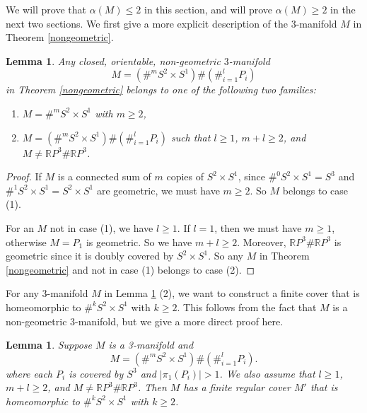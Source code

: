 \documentclass{amsart}
\newtheorem{lem}[thm]{Lemma}
\begin{document}
 We will prove that $\alpha(M)\leq 2$ in this section, and will prove $\alpha(M)\geq 2$ in the next two sections. We first give a more explicit description of the $3$-manifold $M$ in Theorem \ref{nongeometric}.
    
\begin{lem}\label{classify}
Any closed, orientable, non-geometric $3$-manifold $$M=(\#^mS^2\times S^1)\#(\#_{i=1}^l P_i)$$ in Theorem \ref{nongeometric} belongs to one of the following two families:
\begin{enumerate}
\item $M=\#^mS^2\times S^1$ with $m\geq 2$,
\item $M=(\#^mS^2\times S^1)\#(\#_{i=1}^l P_i)$ such that $l\geq 1$, $m+l\geq 2$, and $M\ne \mathbb{R}P^3\#\mathbb{R}P^3$.
\end{enumerate}
\end{lem}

\begin{proof}
If $M$ is a connected sum of $m$ copies of $S^2\times S^1$, since $\#^0S^2\times S^1=S^3$ and $\#^1S^2\times S^1=S^2\times S^1$ are geometric, we must have $m\geq 2$. So $M$ belongs to case (1).

For an $M$ not in case (1), we have $l\geq 1$. If $l=1$, then we must have $m\geq 1$, otherwise $M=P_1$ is geometric. So we have $m+l\geq 2$. Moreover, $\mathbb{R}P^3\# \mathbb{R}P^3$ is geometric since it is doubly covered by $S^2\times S^1$. So any $M$ in Theorem \ref{nongeometric} and not in case (1) belongs to case (2). 
\end{proof}

For any $3$-manifold $M$ in Lemma \ref{classify} (2), we want to construct a finite cover that is homeomorphic to $\#^k S^2\times S^1$ with $k\geq 2$. This follows from the fact that $M$ is a non-geometric $3$-manifold, but we give a more direct proof here.

\begin{lem}\label{cover}
 Suppose $M$ is a 3-manifold and  \[
        M=(\#^mS^2\times S^1)\#(\#_{i=1}^l P_i).
    \] where each $P_i$ is covered by $S^3$ and $|\pi_1(P_i)|>1$. We also assume that $l\geq 1$, $m+l\geq 2$, and $M\ne \mathbb{R}P^3\# \mathbb{R}P^3$. Then $M$ has a finite regular cover $M'$ that is homeomorphic to $\#^k S^2\times S^1$ with $k\geq 2$.
 \end{lem}
 
\end{document}
